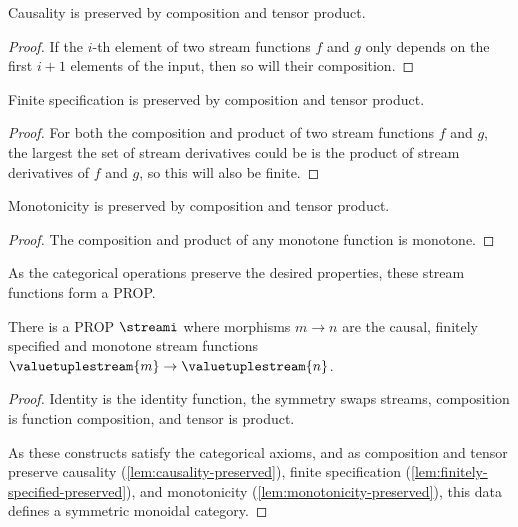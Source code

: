 \begin{lemma}\label{lem:causality-preserved}
    Causality is preserved by composition and tensor product.
\end{lemma}
\begin{proof}
    If the \(i\)-th element of two stream functions \(f\) and \(g\) only depends
    on the first \(i+1\) elements of the input, then so will their composition.
\end{proof}

\begin{lemma}\label{lem:finitely-specified-preserved}
    Finite specification is preserved by composition and tensor product.
\end{lemma}
\begin{proof}
    For both the composition and product of two stream functions \(f\) and
    \(g\), the largest the set of stream derivatives could be is the product of
    stream derivatives of \(f\) and \(g\), so this will also be finite.
\end{proof}

\begin{lemma}\label{lem:monotonicity-preserved}
    Monotonicity is preserved by composition and tensor product.
\end{lemma}
\begin{proof}
    The composition and product of any monotone function is monotone.
\end{proof}

As the categorical operations preserve the desired properties, these stream
functions form a PROP.

\begin{proposition}
    There is a PROP \(\streami\) where morphisms \(m \to n\) are the causal,
    finitely specified and monotone stream functions \(
    \valuetuplestream{m} \to \valuetuplestream{n}
    \).
\end{proposition}
\begin{proof}
    Identity is the identity function, the symmetry swaps streams, composition
    is function composition, and tensor is product.

    As these constructs satisfy the categorical axioms, and as composition and
    tensor preserve causality (\cref{lem:causality-preserved}),
    finite specification (\cref{lem:finitely-specified-preserved}),
    and monotonicity (\cref{lem:monotonicity-preserved}), this data defines a
    symmetric monoidal category.
\end{proof}

